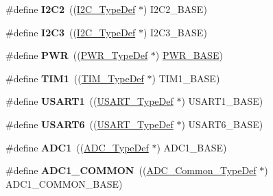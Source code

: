 \begin{DoxyCompactItemize}
\#define {\bfseries I2\+C2}~((\hyperlink{struct_i2_c___type_def}{I2\+C\+\_\+\+Type\+Def} $\ast$) I2\+C2\+\_\+\+B\+A\+SE)
\item 
\mbox{\label{group___peripheral__declaration_ga1489b37ed2bca9d9c659119590583bda}} 
\#define {\bfseries I2\+C3}~((\hyperlink{struct_i2_c___type_def}{I2\+C\+\_\+\+Type\+Def} $\ast$) I2\+C3\+\_\+\+B\+A\+SE)
\item 
\mbox{\label{group___peripheral__declaration_ga04651c526497822a859942b928e57f8e}} 
\#define {\bfseries P\+WR}~((\hyperlink{struct_p_w_r___type_def}{P\+W\+R\+\_\+\+Type\+Def} $\ast$) \hyperlink{group___peripheral__memory__map_gac691ec23dace8b7a649a25acb110217a}{P\+W\+R\+\_\+\+B\+A\+SE})
\item 
\mbox{\label{group___peripheral__declaration_ga2e87451fea8dc9380056d3cfc5ed81fb}} 
\#define {\bfseries T\+I\+M1}~((\hyperlink{struct_t_i_m___type_def}{T\+I\+M\+\_\+\+Type\+Def} $\ast$) T\+I\+M1\+\_\+\+B\+A\+SE)
\item 
\mbox{\label{group___peripheral__declaration_ga92871691058ff7ccffd7635930cb08da}} 
\#define {\bfseries U\+S\+A\+R\+T1}~((\hyperlink{struct_u_s_a_r_t___type_def}{U\+S\+A\+R\+T\+\_\+\+Type\+Def} $\ast$) U\+S\+A\+R\+T1\+\_\+\+B\+A\+SE)
\item 
\mbox{\label{group___peripheral__declaration_ga2dab39a19ce3dd05fe360dcbb7b5dc84}} 
\#define {\bfseries U\+S\+A\+R\+T6}~((\hyperlink{struct_u_s_a_r_t___type_def}{U\+S\+A\+R\+T\+\_\+\+Type\+Def} $\ast$) U\+S\+A\+R\+T6\+\_\+\+B\+A\+SE)
\item 
\mbox{\label{group___peripheral__declaration_ga90d2d5c526ce5c0a551f533eccbee71a}} 
\#define {\bfseries A\+D\+C1}~((\hyperlink{struct_a_d_c___type_def}{A\+D\+C\+\_\+\+Type\+Def} $\ast$) A\+D\+C1\+\_\+\+B\+A\+SE)
\item 
\mbox{\label{group___peripheral__declaration_gaf1919c64fc774aab31190346fd5457e2}} 
\#define {\bfseries A\+D\+C1\+\_\+\+C\+O\+M\+M\+ON}~((\hyperlink{struct_a_d_c___common___type_def}{A\+D\+C\+\_\+\+Common\+\_\+\+Type\+Def} $\ast$) A\+D\+C1\+\_\+\+C\+O\+M\+M\+O\+N\+\_\+\+B\+A\+SE)

\end{DoxyCompactItemize}
